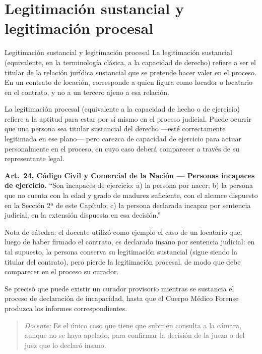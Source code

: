 \documentclass[12pt,oneside]{book}
\begin{document}
\section{Legitimación sustancial y legitimación procesal}

\begin{definition}{Legitimación sustancial y legitimación procesal}
La legitimación sustancial (equivalente, en la terminología clásica, a la capacidad de derecho) refiere a ser el titular de la relación jurídica sustancial que se pretende hacer valer en el proceso. En un contrato de locación, corresponde a quien figura como locador o locatario en el contrato, y no a un tercero ajeno a esa relación.

La legitimación procesal (equivalente a la capacidad de hecho o de ejercicio) refiere a la aptitud para estar por sí mismo en el proceso judicial. Puede ocurrir que una persona sea titular sustancial del derecho —esté correctamente legitimada en ese plano— pero carezca de capacidad de ejercicio para actuar personalmente en el proceso, en cuyo caso deberá comparecer a través de su representante legal.
\end{definition}

\begin{important}
\textbf{Art.\ 24, Código Civil y Comercial de la Nación — Personas incapaces de ejercicio.} ``Son incapaces de ejercicio: a) la persona por nacer; b) la persona que no cuenta con la edad y grado de madurez suficiente, con el alcance dispuesto en la Sección 2ª de este Capítulo; c) la persona declarada incapaz por sentencia judicial, en la extensión dispuesta en esa decisión.''

Nota de cátedra: el docente utilizó como ejemplo el caso de un locatario que, luego de haber firmado el contrato, es declarado insano por sentencia judicial: en tal supuesto, la persona conserva su legitimación sustancial (sigue siendo la titular del contrato), pero pierde la legitimación procesal, de modo que debe comparecer en el proceso su curador.
\end{important}

Se precisó que puede existir un curador provisorio mientras se sustancia el proceso de declaración de incapacidad, hasta que el Cuerpo Médico Forense produzca los informes correspondientes.

\begin{quote}
\textit{Docente:} Es el único caso que tiene que subir en consulta a la cámara, aunque no se haya apelado, para confirmar la decisión de la jueza o del juez que lo declaró insano.
\end{quote}
\end{document}
